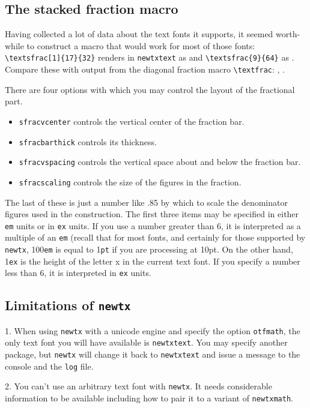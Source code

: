 \documentclass[\fsc]{article}
\theoremstyle{oldplain}
\theoremstyle{plain}
\begin{document}
\subsection{The stacked fraction macro}
Having collected a lot of data about the text fonts it supports, it seemed worth-while to construct a macro that would work for most of those fonts: \verb|\textsfrac[1]{17}{32}| renders in {\tt newtxtext} as  and \verb|\textsfrac{9}{64}| as . Compare these with output from the diagonal fraction macro \verb|\textfrac|: , .

There are four options with which you may control the layout of the fractional part.
\begin{itemize}
\item
{\tt sfracvcenter} controls the vertical center of the fraction bar.
\item{\tt sfracbarthick} controls its thickness.
\item{\tt sfracvspacing} controls the vertical space about and below the fraction bar.
\item{\tt sfracscaling} controls the size of the figures in the fraction.
\end{itemize}
The last of these is just a number like .85 by which to scale the denominator figures used in the construction. The first three items may be specified in either {\tt em} units or in {\tt ex} units. If you use a number greater than 6, it is interpreted as a multiple of an {\tt em} (recall that for most fonts, and certainly for those supported by {\tt newtx}, 100{\tt em} is equal to 1{\tt pt} if you are processing at 10pt. On the other hand, 1{\tt ex} is the height of the letter x in the current text font. If you specify a number less than 6, it is interpreted in {\tt ex} units.

\subsection{Limitations of {\tt newtx}}

1. When using {\tt newtx} with a unicode engine and specify the option {\tt otfmath}, the only text font you will have available is {\tt newtxtext}. You may specify another package, but {\tt newtx} will change it back to {\tt newtxtext} and issue a message to the console and the {\tt log} file.

2. You can't use an arbitrary text font with {\tt newtx}. It needs considerable information to be available including how to pair it to a variant of {\tt newtxmath}.
\end{document}
